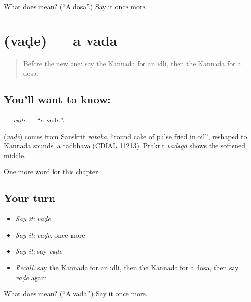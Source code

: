 \begin{tcolorbox}[breakable,colback=teal!4,colframe=teal!35!black,title={Before you move on}]
What does  mean? (\textquotedblleft{}A dosa\textquotedblright{}.) Say it once more.
\end{tcolorbox}
\section[\texorpdfstring{\kn{ವಡೆ} (vaḍe)}{ವಡೆ (vaḍe)}]{ (vaḍe) — a vada}

\label{lesson:KA-C125-vade}



\begin{quote}
Before the new one: say the Kannada for an idli, then the Kannada for a dosa.
\end{quote}

\subsection*{You'll want to know: }
\textbf{} — \emph{vaḍe} — \textquotedblleft{}a vada\textquotedblright{}.

\begin{cousinweb}
\textbf{} (\emph{vaḍe}) comes from Sanskrit \emph{vaṭaka}, \textquotedblleft{}round cake of pulse fried in oil\textquotedblright{}, reshaped to Kannada sounds: a tadbhava (CDIAL 11213). Prakrit \emph{vaḍaga} shows the softened middle.
\end{cousinweb}

\begin{grammarlens}[title={What you've built}]
One more word for this chapter.
\end{grammarlens}

\subsection*{Your turn}
\begin{itemize}
\raggedright
  \item \emph{Say it:} \emph{vaḍe}
  \item \emph{Say it:} \emph{vaḍe}, once more
  \item \emph{Say it:} say \emph{vaḍe}
  \item \emph{Recall:} say the Kannada for an idli, then the Kannada for a dosa, then say \emph{vaḍe} again
\end{itemize}

\begin{tcolorbox}[breakable,colback=teal!4,colframe=teal!35!black,title={Before you move on}]
What does  mean? (\textquotedblleft{}A vada\textquotedblright{}.) Say it once more.
\end{tcolorbox}
